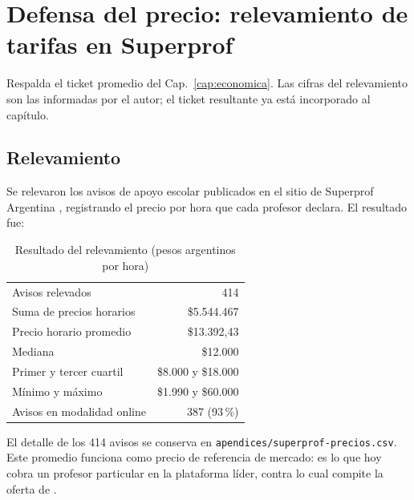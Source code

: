 
\chapter{Defensa del precio: relevamiento de tarifas en Superprof}\label{apx:precio}

\begin{guia}
Respalda el ticket promedio del Cap.~\ref{cap:economica}. Las cifras del
relevamiento son las informadas por el autor; el ticket resultante ya está
incorporado al capítulo.
\end{guia}

\section{Relevamiento}

Se relevaron los avisos de apoyo escolar publicados en el sitio de
Superprof Argentina \citep{superprof}, registrando el precio por hora que
cada profesor declara. El resultado fue:

\begin{table}[H]
    \centering
    \caption{Resultado del relevamiento (pesos argentinos por hora)}
    \label{tab:relevamiento-superprof}
    \small
    \begin{tabularx}{\textwidth}{L r}
        \toprule
         &  \\
        \midrule
        Avisos relevados                    & 414 \\
        Suma de precios horarios            & \$5.544.467 \\
        Precio horario promedio             & \$13.392,43 \\
        Mediana                             & \$12.000 \\
        Primer y tercer cuartil             & \$8.000 y \$18.000 \\
        Mínimo y máximo                     & \$1.990 y \$60.000 \\
        Avisos en modalidad online          & 387 (93\,\%) \\
        \bottomrule
    \end{tabularx}
\end{table}

El detalle de los 414 avisos se conserva en
\texttt{apendices/superprof-precios.csv}. Este promedio funciona como precio de referencia de mercado: es lo que
hoy cobra un profesor particular en la plataforma líder, contra lo cual
compite la oferta de \sistema{}.


